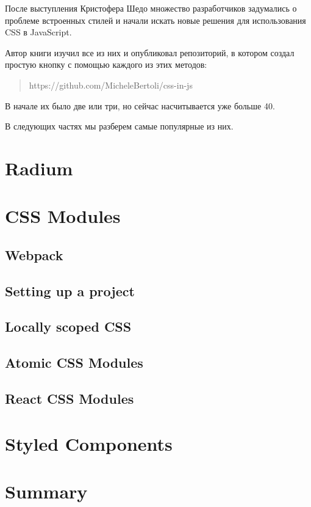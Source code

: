 После выступления Кристофера Шедо множество разработчиков задумались о проблеме встроенных стилей и начали искать новые решения для использования CSS в JavaScript.

Автор книги изучил все из них и опубликовал репозиторий, в котором создал простую кнопку с помощью каждого из этих методов:

\begin{quotation}
https://github.com/MicheleBertoli/css-in-js
\end{quotation}

В начале их было две или три, но сейчас насчитывается уже больше 40.

В следующих частях мы разберем самые популярные из них.

\section{Radium}

\section{CSS Modules}

\subsection{Webpack}

\subsection{Setting up a project}

\subsection{Locally scoped CSS}

\subsection{Atomic CSS Modules}

\subsection{React CSS Modules}

\section{Styled Components}

\section{Summary}















